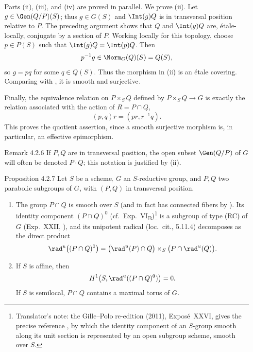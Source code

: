 Parts \textup{(ii)}, \textup{(iii)}, and \textup{(iv)} are proved in
parallel.  We prove \textup{(ii)}.  Let \(g\in\Gen(Q/P)(S)\); thus
\(g\in G(S)\) and \(\Int(g)Q\) is in transversal position relative to
\(P\).  The preceding argument shows that \(Q\) and \(\Int(g)Q\) are,
étale-locally, conjugate by a section of \(P\).  Working locally for
this topology, choose \(p\in P(S)\) such that
\(\Int(g)Q=\Int(p)Q\).  Then
\[
 p^{-1}g\in\Norm_G(Q)(S)=Q(S),
\]
so \(g=pq\) for some \(q\in Q(S)\).  Thus the morphism in
\textup{(ii)} is an étale covering.  Comparing with
\textup{}, it is smooth and surjective.

Finally, the equivalence relation on \(P\times_SQ\) defined by
\(P\times_SQ\to G\) is exactly the relation associated with the action
of \(R=P\cap Q\),
\[
 (p,q)r=(pr,r^{-1}q).
\]
This proves the quotient assertion, since a smooth surjective morphism
is, in particular, an effective epimorphism.
\SGAQED

\begin{sgastatement}{Remark 4.2.6}
If \(P,Q\) are in transversal position, the open subset \(\Gen(Q/P)\)
of \(G\) will often be denoted \(P\cdot Q\); this notation is justified
by \textup{(ii)}.
\end{sgastatement}

\begin{sgastatement}{Proposition 4.2.7}
Let \(S\) be a scheme, \(G\) an \(S\)-reductive group, and \(P,Q\) two
parabolic subgroups of \(G\), with \((P,Q)\) in transversal position.
\begin{enumerate}[label=\textup{(\roman*)}]
\item The group \(P\cap Q\) is smooth over \(S\) (and in fact has
connected fibers by ).  Its identity component
\((P\cap Q)^0\) \textup{(cf.\ Exp.\ VI\textsubscript{B})}\footnote{Translator's note: the Gille--Polo re-edition (2011), Exposé~XXVI, gives
the precise reference , by which the identity component of
an \(S\)-group smooth along its unit section is represented by an open
subgroup scheme, smooth over \(S\).} is a
subgroup of type \textup{(RC)} of \(G\)
\textup{(Exp.\ XXII, )}, and its unipotent radical
\textup{(loc.\ cit., 5.11.4)} decomposes as the direct product
\[
 \rad^u\bigl((P\cap Q)^0\bigr)
 =
 \bigl(\rad^u(P)\cap Q\bigr)
 \times_S
 \bigl(P\cap\rad^u(Q)\bigr).
\]
\item If \(S\) is affine, then
\[
 H^1\bigl(S,\rad^u((P\cap Q)^0)\bigr)=0.
\]
If \(S\) is semilocal, \(P\cap Q\) contains a maximal torus of \(G\).
\end{enumerate}
\end{sgastatement}

